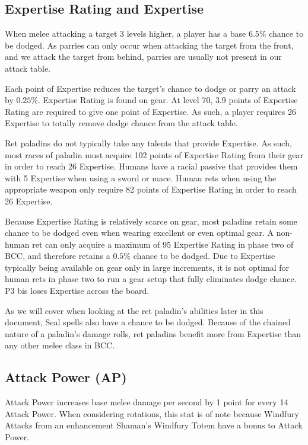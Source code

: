 \documentclass[letterpaper,11pt]{article}
\begin{document}
	\subsection{Expertise Rating and Expertise}
	When melee attacking a target 3 levels higher, a player has a base $6.5\%$ chance to be dodged.
	As parries can only occur when attacking the target from the front, and we attack the target from behind, parries are usually not present in our attack table.

	Each point of Expertise reduces the target's chance to dodge or parry an attack by $0.25\%$.
	Expertise Rating is found on gear.
	At level 70, 3.9 points of Expertise Rating are required to give one point of Expertise.
	As such, a player requires 26 Expertise to totally remove dodge chance from the attack table.
	
	Ret paladins do not typically take any talents that provide Expertise.
	As such, most races of paladin must acquire 102 points of Expertise Rating from their gear in order to reach 26 Expertise.
	Humans have a racial passive that provides them with 5 Expertise when using a sword or mace.
	Human rets when using the appropriate weapon only require 82 points of Expertise Rating in order to reach 26 Expertise.
	
	Because Expertise Rating is relatively scarce on gear, most paladins retain some chance to be dodged even when wearing excellent or even optimal gear.
	A non-human ret can only acquire a maximum of 95 Expertise Rating in phase two of BCC, and therefore retains a $0.5\%$ chance to be dodged.
	Due to Expertise typically being available on gear only in large increments, it is not optimal for human rets in phase two to run a gear setup that fully eliminates dodge chance.
	P3 bis loses Expertise across the board.

	As we will cover when looking at the ret paladin's abilities later in this document, Seal spells also have a chance to be dodged.
	Because of the chained nature of a paladin's damage rolls, ret paladins benefit more from Expertise than any other melee class in BCC.
	
	\subsection{Attack Power (AP)}
	Attack Power increases base melee damage per second by 1 point for every 14 Attack Power.
	When considering rotations, this stat is of note because Windfury Attacks from an enhancement Shaman's Windfury Totem have a bonus to Attack Power.
	
\end{document}
